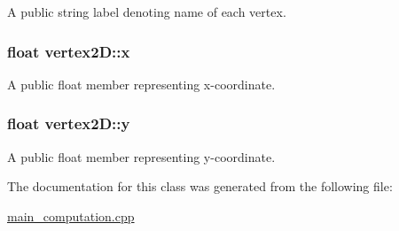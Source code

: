 A public string label denoting name of each vertex. 

\subsubsection[{\texorpdfstring{x}{x}}]{\setlength{\rightskip}{0pt plus 5cm}float vertex2\+D\+::x}\hypertarget{classvertex2D_a2ba74d18c3e8e5a36fd2846a7a4d1a4f}{}\label{classvertex2D_a2ba74d18c3e8e5a36fd2846a7a4d1a4f}


A public float member representing x-\/coordinate. 

\subsubsection[{\texorpdfstring{y}{y}}]{\setlength{\rightskip}{0pt plus 5cm}float vertex2\+D\+::y}\hypertarget{classvertex2D_a6ca32b6427f8d3ce3437db0bafd92a00}{}\label{classvertex2D_a6ca32b6427f8d3ce3437db0bafd92a00}


A public float member representing y-\/coordinate. 



The documentation for this class was generated from the following file\+:\begin{DoxyCompactItemize}
\item 
\hyperlink{main__computation_8cpp}{main\+\_\+computation.\+cpp}\end{DoxyCompactItemize}
